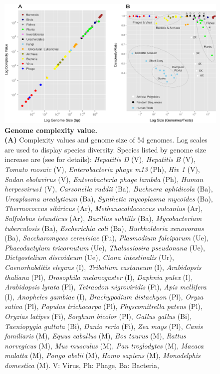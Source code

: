 \begin{figure}[htpb] 
\centering 
\includegraphics[width=\textwidth]{tex_source/figures/dna_struct/genome_complexity.png}
\caption[Genome complexity value]{{\bf Genome complexity value.} \\\textbf{(A)} Complexity values and genome size of 54 genomes. Log scales are used to display species diversity. Species listed by genome size increase are (see  for details): \textit{Hepatitis D} (V), \textit{Hepatitis B} (V), \textit{Tomato mosaic} (V), \textit{Enterobacteria phage m13} (Ph), \textit{Hiv 1} (V), \textit{Sudan ebolavirus} (V), \textit{Enterobacteria phage lambda} (Ph), \textit{Human herpesvirus1} (V), \textit{Carsonella ruddii} (Ba), \textit{Buchnera aphidicola} (Ba), \textit{Ureaplasma urealyticum} (Ba), \textit{Synthetic mycoplasma mycoides} (Ba), \textit{Thermococcus
sibiricus} (Ar), \textit{Methanocaldococcus vulcanius} (Ar), \textit{Sulfolobus islandicus} (Ar), \textit{Bacillus subtilis} (Ba), \textit{Mycobacterium tuberculosis} (Ba), \textit{Escherichia coli} (Ba),
\textit{Burkholderia xenovorans} (Ba), \textit{Saccharomyces cerevisiae} (Fu), \textit{Plasmodium falciparum} (Ue), \textit{Phaeodactylum tricornutum} (Ue), \textit{Thalassiosira pseudonana} (Ue), \textit{Dictyostelium discoideum} (Ue), \textit{Ciona intestinalis} (Ur), \textit{Caenorhabditis elegans} (I), \textit{Tribolium castaneum} (I), \textit{Arabidopsis thaliana} (Pl), \textit{Drosophila melanogaster} (I), \textit{Daphnia pulex} (I), \textit{Arabidopsis lyrata} (Pl), \textit{Tetraodon nigroviridis} (Fi), \textit{Apis mellifera} (I), \textit{Anopheles gambiae} (I), \textit{Brachypodium distachyon} (Pl), \textit{Oryza sativa} (Pl), \textit{Populus
trichocarpa} (Pl), \textit{Physcomitrella patens} (Pl), \textit{Oryzias latipes} (Fi), \textit{Sorghum bicolor} (Pl), \textit{Gallus gallus} (Bi), \textit{Taeniopygia guttata} (Bi), \textit{Danio rerio} (Fi), \textit{Zea mays} (Pl), \textit{Canis familiaris} (M), \textit{Equus caballus} (M), \textit{Bos taurus} (M), \textit{Rattus norvegicus} (M), \textit{Mus musculus} (M), \textit{Pan troglodytes} (M), \textit{Macaca mulatta} (M), \textit{Pongo abelii} (M), \textit{Homo sapiens} (M), \textit{Monodelphis domestica} (M). V: Virus, Ph: Phage, Ba: Bacteria,
}
\end{figure}
